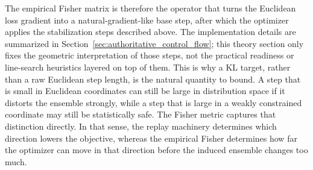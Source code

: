 The empirical Fisher matrix is therefore the operator that turns the Euclidean loss gradient into a natural-gradient-like base step, after which the optimizer applies the stabilization steps described above. The implementation details are summarized in Section~\ref{sec:authoritative_control_flow}; this theory section only fixes the geometric interpretation of those steps, not the practical readiness or line-search heuristics layered on top of them. This is why a KL target, rather than a raw Euclidean step length, is the natural quantity to bound. A step that is small in Euclidean coordinates can still be large in distribution space if it distorts the ensemble strongly, while a step that is large in a weakly constrained coordinate may still be statistically safe. The Fisher metric captures that distinction directly. In that sense, the replay machinery determines which direction lowers the objective, whereas the empirical Fisher determines how far the optimizer can move in that direction before the induced ensemble changes too much.
